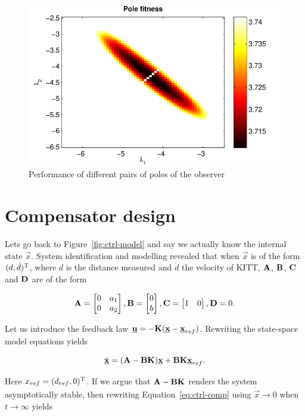\documentclass[11pt,titlepage]{report}
\begin{document}
\begin{figure}[H]
	\begin{center}
		\includegraphics[width=.6\linewidth]{resource/pole-fitness.pdf}
	\end{center}
	\caption{Performance of different pairs of poles of the observer}
	\label{fig:ctrl-poles}
\end{figure}

\section{Compensator design}
Lets go back to Figure~\ref{fig:ctrl-model} and say we actually know the internal state $\vec{x}$. System identification and modelling revealed that when $\vec{x}$ is of the form $(d,\dot{d})^{\text T}$, where $d$ is the distance measured and $\dot{d}$ the velocity of KITT, $\mathbf{A}$, $\mathbf{B}$, $\mathbf{C}$ and $\mathbf{D}$ are of the form

\begin{equation}
	\mathbf{A} = \begin{bmatrix}
		0 & a_1 \\
		0 & a_2
	\end{bmatrix}, \mathbf{B} = \begin{bmatrix}
		0 \\
		b
	\end{bmatrix}, \mathbf{C} = \begin{bmatrix}
		1 & 0
	\end{bmatrix}, \mathbf{D} = 0.
\end{equation}

Let us introduce the feedback law $\mathbf{\underline{u}} = -\mathbf{K}(\mathbf{\underline{x}}-\mathbf{\underline{x}}_{ref})$. Rewriting the state-space model equations yields

\begin{equation} \label{eq:ctrl-comp}
	\dot{\mathbf{\underline{x}}} = (\mathbf{A} - \mathbf{B} \mathbf{K}) \mathbf{\underline{x}} + \mathbf{B} \mathbf{K} \mathbf{\underline{x}}_{ref}.
\end{equation}


Here $x_{ref}=(d_{ref},0)^{\text T}$. If we argue that $\mathbf{A} - \mathbf{B} \mathbf{K}$ renders the system asymptotically stable, then rewriting Equation~\ref{eq:ctrl-comp} using $\dot{\vec{x}} \to 0$ when $t \to \infty$ yields
\end{document}
